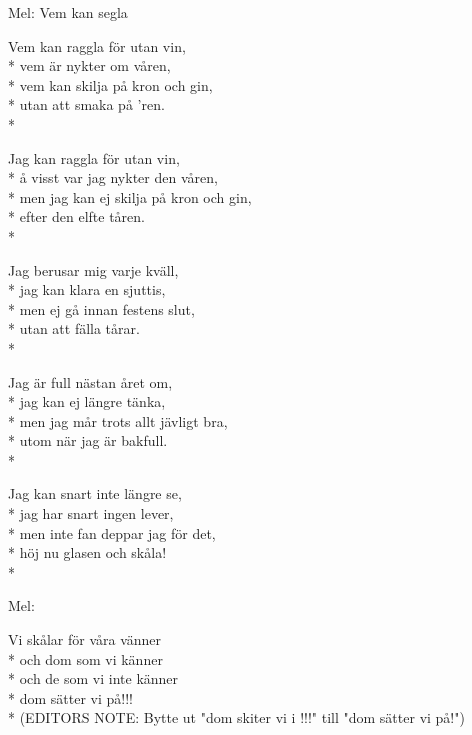 \begin{SongText}
    \begin{SongInfo}
        Mel: Vem kan segla
    \end{SongInfo}
    \begin{SongVerse}
        Vem kan raggla för utan vin,\\*%
        vem är nykter om våren,\\*%
        vem kan skilja på kron och gin,\\*%
        utan att smaka på 'ren.\\*%
    \end{SongVerse}
    \begin{SongVerse}
        Jag kan raggla för utan vin,\\*%
        å visst var jag nykter den våren,\\*%
        men jag kan ej skilja på kron och gin,\\*%
        efter den elfte tåren.\\*%
    \end{SongVerse}
    \begin{SongVerse}
        Jag berusar mig varje kväll,\\*%
        jag kan klara en sjuttis,\\*%
        men ej gå innan festens slut,\\*%
        utan att fälla tårar.\\*%
    \end{SongVerse}
    \begin{SongVerse}
        Jag är full nästan året om,\\*%
        jag kan ej längre tänka,\\*%
        men jag mår trots allt jävligt bra,\\*%
        utom när jag är bakfull.\\*%
    \end{SongVerse}
    \begin{SongVerse}
        Jag kan snart inte längre se,\\*%
        jag har snart ingen lever,\\*%
        men inte fan deppar jag för det,\\*%
        höj nu glasen och skåla!\\*%
    \end{SongVerse}
\end{SongText}
\begin{SongText}
    \begin{SongInfo}
        Mel:
    \end{SongInfo}
    \begin{SongVerse}
        Vi skålar för våra vänner\\*%
        och dom som vi känner\\*%
        och de som vi inte känner\\*%
        dom sätter vi på!!!\\*%
        (EDITORS NOTE: Bytte ut "dom skiter vi i !!!" till "dom sätter vi på!")
    \end{SongVerse}
\end{SongText}
